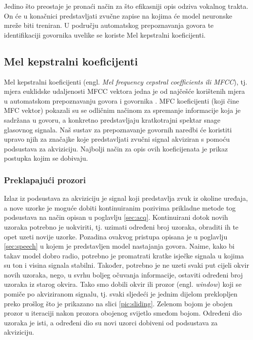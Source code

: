 Jedino što preostaje je pronaći način za što efikasniji opis odziva vokalnog trakta. On će
u konačnici predstavljati zvučne zapise na kojima će model neuronske mreže biti treniran.
U području automatskog prepoznavanja govora te identifikaciji govornika uvelike se koriste
Mel kepstralni koeficijenti.


\subsection{Mel kepstralni koeficijenti}
\label{MFCCconstruction}
Mel kepstralni koeficijenti (engl. \textit{Mel frequency cepstral coefficients ili MFCC}), tj. mjera 
euklidske udaljenosti MFCC vektora jedna je od najčešće korištenih mjera u automatskom 
prepoznavanju govora i govornika \cite{vasilijevic2011perceptual}. 
MFC koeficijenti (koji čine MFC vektor) pokazali su se odličnim načinom za spremanje informacije
koja je sadržana u govoru, a konkretno predstavljaju kratkotrajni spektar snage glasovnog 
signala. Naš sustav za prepoznavanje govornih naredbi će koristiti upravo njih za 
značajke koje predstavljati zvučni signal akviziran s pomoću podsustava za akviziciju. 
Najbolji način za opis ovih koeficijenata je prikaz postupka kojim se dobivaju.


\subsubsection{Preklapajući prozori}
\label{sec:win}
Izlaz iz podsustava za akviziciju je signal koji predstavlja zvuk iz okoline uređaja, 
a nove uzorke je moguće dobiti kontinuiranim pozivima prikladne metode tog podsustava
na način opisan u poglavlju \ref{sec:acq}. Kontinuirani dotok novih uzoraka potrebno 
je uokviriti, tj. uzimati određeni broj uzoraka, obraditi ih te opet uzeti novije uzorke. 
Pozadina ovakvog pristupa opisana je u poglavlju \ref{sec:speech} u kojem je predstavljen
model nastajanja govora. Naime, kako bi takav model dobro radio, potrebno je promatrati
kratke isječke signala u kojima su ton i visina signala stabilni. Također, potrebno je
ne uzeti svaki put cijeli okvir novih uzoraka, nego, u svrhu boljeg očuvanja informacije,
ostaviti određeni broj uzoraka iz starog okvira. Tako smo dobili okvir ili 
prozor (engl. \textit{window})
koji se pomiče po akviziranom signalu, tj. svaki sljedeći je jednim dijelom preklopljen
preko prošlog što je prikazano na slici \ref{pic:sliding}. Zelenom bojom je obojen prozor
u iteraciji nakon prozora obojenog svijetlo smeđom bojom. Određeni dio uzoraka je isti,
a određeni dio su novi uzorci dobiveni od podsustava za akviziciju.

